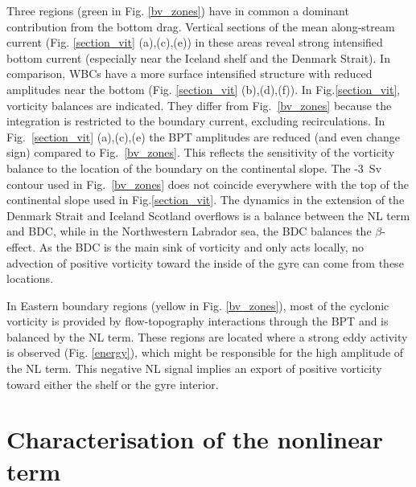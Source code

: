 \documentclass{ametsoc}
\newcommand{\jg}[1]{\textcolor{red}{JG: #1}}
\begin{document}
Three regions (green in Fig. \ref{bv_zones}) have in common a dominant contribution from the bottom drag. Vertical sections of the mean along-stream current (Fig. \ref{section_vit} (a),(c),(e)) in these areas reveal strong intensified bottom current (especially near the Iceland shelf and the Denmark Strait). In comparison, WBCs have a more surface intensified structure with reduced amplitudes near the bottom (Fig. \ref{section_vit} (b),(d),(f)). In Fig.\ref{section_vit}, vorticity balances are indicated. They differ from Fig.~\ref{bv_zones} because the integration is restricted to the boundary current, excluding recirculations. In Fig.~\ref{section_vit} (a),(c),(e) the BPT amplitudes are reduced (and even change sign) compared to Fig.~\ref{bv_zones}. This reflects the sensitivity of the vorticity balance to the location of the boundary on the continental slope. The -3~Sv contour used in Fig.~\ref{bv_zones} does not coincide everywhere with the top of the continental slope used in Fig.\ref{section_vit}. 
The dynamics in the extension of the Denmark Strait and Iceland Scotland overflows is a balance between the NL term and BDC, while in the Northwestern Labrador sea, the BDC balances the $\beta$-effect. As the BDC is the main sink of vorticity and only acts locally, no advection of positive vorticity toward the inside of the gyre can come from these locations.

In Eastern boundary regions (yellow in Fig. \ref{bv_zones}), most of the cyclonic vorticity is provided by flow-topography interactions through the BPT and is balanced by the NL term. These regions are located where a strong eddy activity is observed (Fig. \ref{energy}), which might be responsible for the high amplitude of the NL term. This negative NL signal implies an export of positive vorticity toward either the shelf or the gyre interior. 


\section{Characterisation of the nonlinear term}
\end{document}
